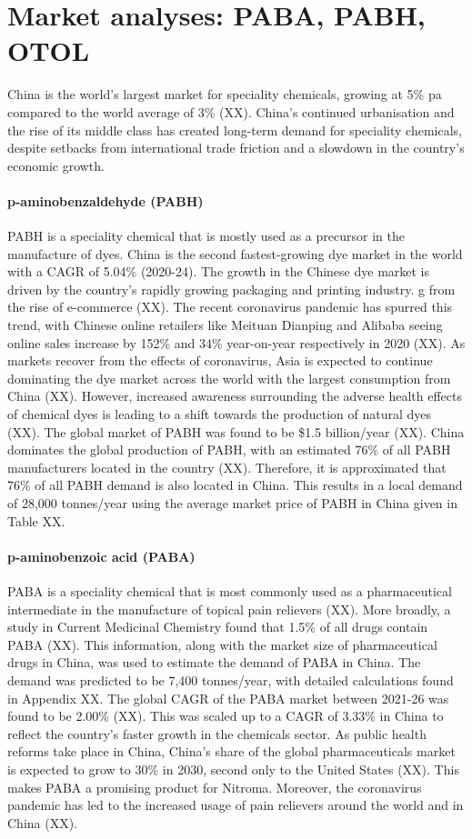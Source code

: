 \section{Market analyses: PABA, PABH, OTOL}
China is the world’s largest market for speciality chemicals, growing at 5\% pa compared to the world average of 3\% (XX). China’s continued urbanisation and the rise of its middle class has created long-term demand for speciality chemicals, despite setbacks from international trade friction and a slowdown in the country’s economic growth.

\paragraph{p-aminobenzaldehyde (PABH)}
PABH is a speciality chemical that is mostly used as a precursor in the manufacture of dyes. China is the second fastest-growing dye market in the world with a CAGR of 5.04\% (2020-24). The growth in the Chinese dye market is driven by the country’s rapidly growing packaging and printing industry. g from the rise of e-commerce (XX). The recent coronavirus pandemic has spurred this trend, with Chinese online retailers like Meituan Dianping and Alibaba seeing online sales increase by 152\% and 34\% year-on-year respectively in 2020 (XX). As markets recover from the effects of coronavirus, Asia is expected to continue dominating the dye market across the world with the largest consumption from China (XX). However, increased awareness surrounding the adverse health effects of chemical dyes is leading to a shift towards the production of natural dyes (XX). The global market of PABH was found to be \$1.5 billion/year (XX). China dominates the global production of PABH, with an estimated 76\% of all PABH manufacturers located in the country (XX). Therefore, it is approximated that 76\% of all PABH demand is also located in China. This results in a local demand of 28,000 tonnes/year using the average market price of PABH in China given in Table XX.

\paragraph{p-aminobenzoic acid (PABA)}
PABA is a speciality chemical that is most commonly used as a pharmaceutical intermediate in the manufacture of topical pain relievers (XX). More broadly, a study in Current Medicinal Chemistry found that 1.5\% of all drugs contain PABA (XX). This information, along with the market size of pharmaceutical drugs in China, was used to estimate the demand of PABA in China. The demand was predicted to be 7,400 tonnes/year, with detailed calculations found in Appendix XX. The global CAGR of the PABA market between 2021-26 was found to be 2.00\% (XX). This was scaled up to a CAGR of 3.33\% in China to reflect the country’s faster growth in the chemicals sector. As public health reforms take place in China, China’s share of the global pharmaceuticals market is expected to grow to 30\% in 2030, second only to the United States (XX). This makes PABA a promising product for Nitroma. Moreover, the coronavirus pandemic has led to the increased usage of pain relievers around the world and in China (XX).

